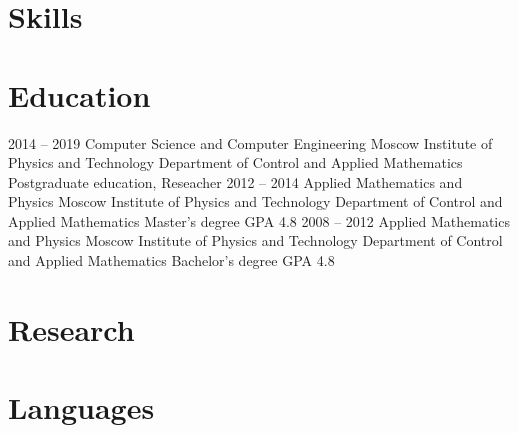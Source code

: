 \documentclass[11pt,a4paper]{moderncv}
\begin{document}
\newpage

\section{Skills}

\section{Education}
  \cventry
    {2014 -- 2019}
    {Computer Science and Computer Engineering}
    {Moscow Institute of Physics and Technology}
    {Department of Control and Applied Mathematics}
    {Postgraduate education, Reseacher}{}
  \cventry
    {2012 -- 2014}
    {Applied Mathematics and Physics}
    {Moscow Institute of Physics and Technology}
    {Department of Control and Applied Mathematics}
    {Master's degree}
    {GPA 4.8}
  \cventry
    {2008 -- 2012}
    {Applied Mathematics and Physics}
    {Moscow Institute of Physics and Technology}
    {Department of Control and Applied Mathematics}
    {Bachelor's degree}
    {GPA 4.8}

\section{Research}

\section{Languages}
\end{document}
